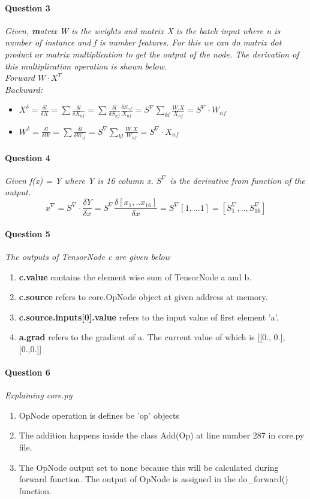 \documentclass[a4 paper]{article}
\begin{document}
\paragraph{Question 3} \textit{Given, \textbf matrix {W} is the weights and matrix \textit{X} is the batch input where n is number of instance and f is number features. For this we can do matrix dot product or matrix multiplication to get the \emph{output} of the node. The derivation of this multiplication operation is shown below.}\\
\textit{Forward $W \cdot X^T$}\\
\textit{Backward:}
\begin{itemize}
    \item $X^\delta = \frac{\delta l}{\delta X} = \sum \frac{\delta l}{\delta X_{nf}} = \sum \frac{\delta l}{\delta S_{nf}} \frac{\delta S_{nf}}{X_{nf}} = S^\nabla \sum_{kl} \frac{W.X}{X_{nf}} = S^\nabla \cdot W_{nf}$
    \item $W^\delta = \frac{\delta l}{\delta W} = \sum \frac{\delta l}{\delta W_{ij}} = S^\nabla \sum_{kl} \frac{W.X}{W_{nf}} = S^\nabla \cdot X_{nf}$ 
\end{itemize}

\paragraph{Question 4} \textit{Given f(x) = Y where Y is 16 column x. $S^\nabla$ is the derivative from function of the output.}
$$x^\nabla = S^\nabla \cdot \frac{\delta Y}{\delta x} = S^\nabla \frac{\delta [x_1,..x_16]}{\delta x} = S^\nabla [1,...1] = [S_1^\nabla,..,S_{16}^\nabla]$$
\paragraph{Question 5} \textit{The outputs of TensorNode c are given below}
\begin{enumerate}
    \item \textbf{c.value} contains the element wise sum of TensorNode a and b. 
    \item \textbf{c.source} refers to core.OpNode object at given address at memory.  
    \item \textbf{c.source.inputs[0].value} refers to the input value of first element 'a'.
    \item \textbf{a.grad} refers to the gradient of a. The current value of which is [[0., 0.],[0.,0.]]
\end{enumerate}

\paragraph{Question 6} \textit{Explaining core.py}
\begin{enumerate}
    \item OpNode operation is defines be 'op' objects 
    \item The addition happens inside the class Add(Op) at line number 287 in core.py file. 
    \item The OpNode output set to none because this will be calculated during forward function. The output of OpNode is assigned in the do\_forward() function. 
\end{enumerate}
\end{document}
